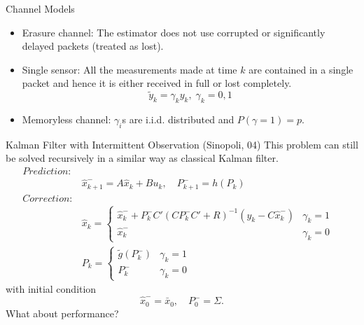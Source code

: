 \documentclass[10pt]{beamer}
\begin{document}
  \begin{frame}{Channel Models}  
    \begin{itemize}
      \item Erasure channel: The estimator does not use corrupted or significantly delayed packets (treated as lost). 
      \item Single sensor: All the measurements made at time $k$ are contained in a single packet and hence it is either received in full or lost completely.
	\[
	\widetilde y_k = \gamma_k y_k,\;\gamma_k=0,1
	\]
      \item Memoryless channel: $\gamma_i$s are i.i.d. distributed and $P(\gamma = 1) = p$.
    \end{itemize}
  \end{frame}

  \begin{frame}{Kalman Filter with Intermittent Observation}
    (Sinopoli, 04) This problem can still be solved recursively in a similar way as classical Kalman filter. 
    \begin{align*}
      Prediction:&&\\
      &\hat x _{k + 1}^-  = A \hat x_{k} + Bu_k  , \quad P_{k + 1}^-  = h(P_k)\\
      Correction:&&\\
      &\hat x_{k} = \begin{cases}
	\hat x_{k}^-  + P_k^- C'(CP_k^- C'+R)^{-1} (y_k  - C \hat x _{k}^- ) & \gamma_ k = 1\\ 
	\hat x_{k}^-   & \gamma_ k = 0 
      \end{cases}\\
      &P_{k} =\begin{cases}
	\tilde g(P_k^-) & \gamma_k = 1\\
	P_k^-&\gamma_k = 0
      \end{cases}
    \end{align*}
    with initial condition
    \begin{displaymath}
      \hat x_{0}^-  = \bar x_0 ,\quad P_{0}^-  = \Sigma.
    \end{displaymath}
    What about performance?

  \end{frame}
\end{document}
